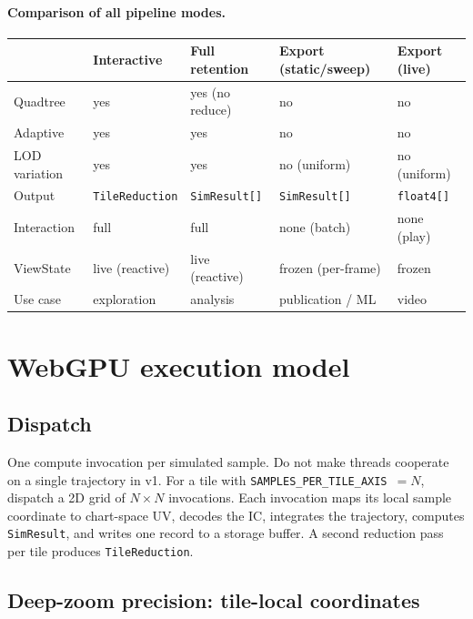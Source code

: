 \documentclass[11pt]{report}
\begin{document}
\paragraph{Comparison of all pipeline modes.}

\begin{center}
\begin{tabular}{lllll}
\toprule
& Interactive & Full retention & Export (static/sweep) & Export (live) \\
\midrule
Quadtree & yes & yes (no reduce) & no & no \\
Adaptive & yes & yes & no & no \\
LOD variation & yes & yes & no (uniform) & no (uniform) \\
Output & \texttt{TileReduction} & \texttt{SimResult[]} & \texttt{SimResult[]} & \texttt{float4[]} \\
Interaction & full & full & none (batch) & none (play) \\
ViewState & live (reactive) & live (reactive) & frozen (per-frame) & frozen \\
Use case & exploration & analysis & publication / ML & video \\
\bottomrule
\end{tabular}
\end{center}

\section{WebGPU execution model}
\label{sec:webgpu_exec}

\subsection{Dispatch}

One compute invocation per simulated sample. Do not make threads cooperate on a single trajectory in v1. For a tile with \texttt{SAMPLES\_PER\_TILE\_AXIS}~$=N$, dispatch a 2D grid of $N\times N$ invocations. Each invocation maps its local sample coordinate to chart-space UV, decodes the IC, integrates the trajectory, computes \texttt{SimResult}, and writes one record to a storage buffer. A second reduction pass per tile produces \texttt{TileReduction}.

\subsection{Deep-zoom precision: tile-local coordinates}
\label{sec:tile_local_precision}
\end{document}
